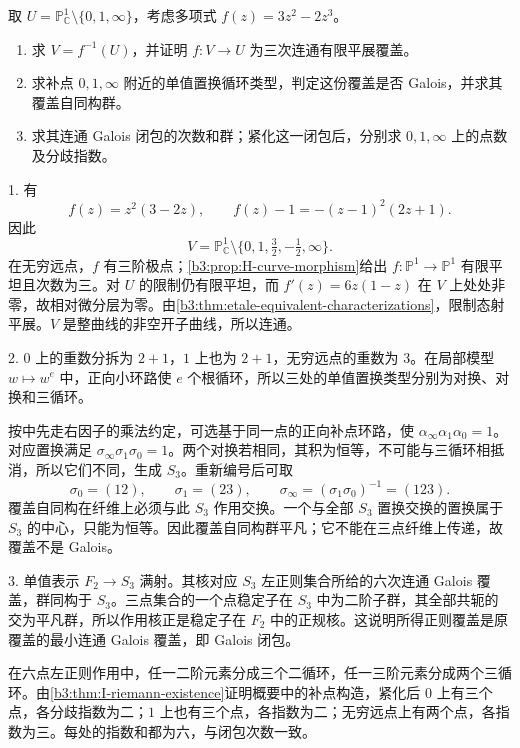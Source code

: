 \begin{exercise}\label{b3:ex:I-three-punctures-cubic}
	取 \(U=\mathbb P_{\mathbb C}^1\setminus\{0,1,\infty\}\)，考虑多项式 \(f(z)=3z^2-2z^3\)。
	\begin{enumerate}
		\item 求 \(V=f^{-1}(U)\)，并证明 \(f:V\rightarrow U\) 为三次连通有限平展覆盖。
		\item 求补点 \(0,1,\infty\) 附近的单值置换循环类型，判定这份覆盖是否 Galois，并求其覆盖自同构群。
		\item 求其连通 Galois 闭包的次数和群；紧化这一闭包后，分别求 \(0,1,\infty\) 上的点数及分歧指数。
	\end{enumerate}
\end{exercise}
\begin{solution}
	1. 有
	\[
		f(z)=z^2(3-2z),\qquad
		f(z)-1=-(z-1)^2(2z+1).
	\]
	因此
	\[
		V=\mathbb P_{\mathbb C}^1
		\setminus\{0,1,\tfrac32,-\tfrac12,\infty\}.
	\]
	在无穷远点，\(f\) 有三阶极点；\cref{b3:prop:H-curve-morphism}给出 \(f:\mathbb P^1\rightarrow\mathbb P^1\) 有限平坦且次数为三。对 \(U\) 的限制仍有限平坦，而 \(f'(z)=6z(1-z)\) 在 \(V\) 上处处非零，故相对微分层为零。由\cref{b3:thm:etale-equivalent-characterizations}，限制态射平展。\(V\) 是整曲线的非空开子曲线，所以连通。

	2. \(0\) 上的重数分拆为 \(2+1\)，\(1\) 上也为 \(2+1\)，无穷远点的重数为 \(3\)。在局部模型 \(w\mapsto w^e\) 中，正向小环路使 \(e\) 个根循环，所以三处的单值置换类型分别为对换、对换和三循环。

	按中先走右因子的乘法约定，可选基于同一点的正向补点环路，使 \(\alpha_\infty\alpha_1\alpha_0=1\)。对应置换满足 \(\sigma_\infty\sigma_1\sigma_0=1\)。两个对换若相同，其积为恒等，不可能与三循环相抵消，所以它们不同，生成 \(S_3\)。重新编号后可取
	\[
		\sigma_0=(12),\qquad \sigma_1=(23),\qquad
		\sigma_\infty=(\sigma_1\sigma_0)^{-1}=(123).
	\]
	覆盖自同构在纤维上必须与此 \(S_3\) 作用交换。一个与全部 \(S_3\) 置换交换的置换属于 \(S_3\) 的中心，只能为恒等。因此覆盖自同构群平凡；它不能在三点纤维上传递，故覆盖不是 Galois。

	3. 单值表示 \(F_2\rightarrow S_3\) 满射。其核对应 \(S_3\) 左正则集合所给的六次连通 Galois 覆盖，群同构于 \(S_3\)。三点集合的一个点稳定子在 \(S_3\) 中为二阶子群，其全部共轭的交为平凡群，所以作用核正是稳定子在 \(F_2\) 中的正规核。这说明所得正则覆盖是原覆盖的最小连通 Galois 覆盖，即 Galois 闭包。

	在六点左正则作用中，任一二阶元素分成三个二循环，任一三阶元素分成两个三循环。由\cref{b3:thm:I-riemann-existence}证明概要中的补点构造，紧化后 \(0\) 上有三个点，各分歧指数为二；\(1\) 上也有三个点，各指数为二；无穷远点上有两个点，各指数为三。每处的指数和都为六，与闭包次数一致。
\end{solution}


